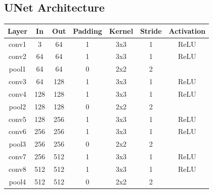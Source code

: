 \subsection*{UNet Architecture}
\begin{table}[H]
	\centering
	\label{tab:unet}
	\setlength{\abovecaptionskip}{10pt}
	\begin{tabular}{|c|c|c|c|c|c|c|}
		\hline
		\textbf{Layer} & \textbf{In} & \textbf{Out} & \textbf{Padding} & \textbf{Kernel} & \textbf{Stride} & \textbf{Activation} \\ \hline
		conv1          & 3           & 64           & 1                & 3x3             & 1               & ReLU                \\ \hline
		conv2          & 64          & 64           & 1                & 3x3             & 1               & ReLU                \\ \hline
		pool1          & 64          & 64           & 0                & 2x2             & 2               &                     \\ \hline
		conv3          & 64          & 128          & 1                & 3x3             & 1               & ReLU                \\ \hline
		conv4          & 128         & 128          & 1                & 3x3             & 1               & ReLU                \\ \hline
		pool2          & 128         & 128          & 0                & 2x2             & 2               &                     \\ \hline
		conv5          & 128         & 256          & 1                & 3x3             & 1               & ReLU                \\ \hline
		conv6          & 256         & 256          & 1                & 3x3             & 1               & ReLU                \\ \hline
		pool3          & 256         & 256          & 0                & 2x2             & 2               &                     \\ \hline
		conv7          & 256         & 512          & 1                & 3x3             & 1               & ReLU                \\ \hline
		conv8          & 512         & 512          & 1                & 3x3             & 1               & ReLU                \\ \hline
		pool4          & 512         & 512          & 0                & 2x2             & 2               &                     \\ \hline

\end{tabular}
\end{table}
